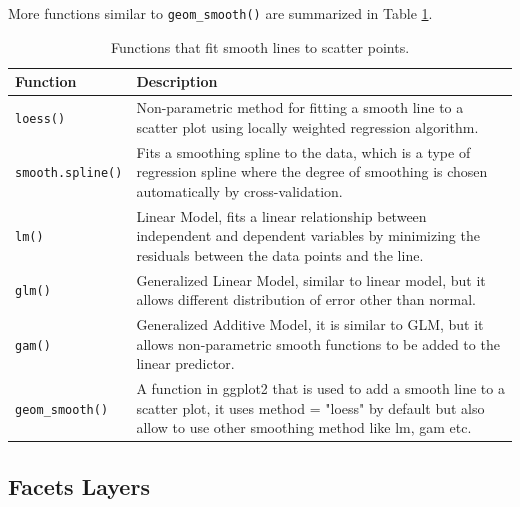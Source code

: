 More functions similar to \verb|geom_smooth()| are summarized in Table \ref{ch:r1:tab:linefit}.
\begin{table}
	\centering \caption{Functions that fit smooth lines to scatter points.}\label{ch:r1:tab:linefit}
	\begin{tabularx}{\textwidth}{lX}
	\hline
	Function & Description \\ \hline
	\verb|loess()| & Non-parametric method for fitting a smooth line to a scatter plot using locally weighted regression algorithm.\\
	\verb|smooth.spline()| & Fits a smoothing spline to the data, which is a type of regression spline where the degree of smoothing is chosen automatically by cross-validation.\\
	\verb|lm()| & Linear Model, fits a linear relationship between independent and dependent variables by minimizing the residuals between the data points and the line.\\
	\verb|glm()| & Generalized Linear Model, similar to linear model, but it allows different distribution of error other than normal.\\
	\verb|gam()| & Generalized Additive Model, it is similar to GLM, but it allows non-parametric smooth functions to be added to the linear predictor.\\
	\verb|geom_smooth()| & A function in ggplot2 that is used to add a smooth line to a scatter plot, it uses method = "loess" by default but also allow to use other smoothing method like lm, gam etc.\\
	\hline
	\end{tabularx}
\end{table}

\subsection{Facets Layers}

